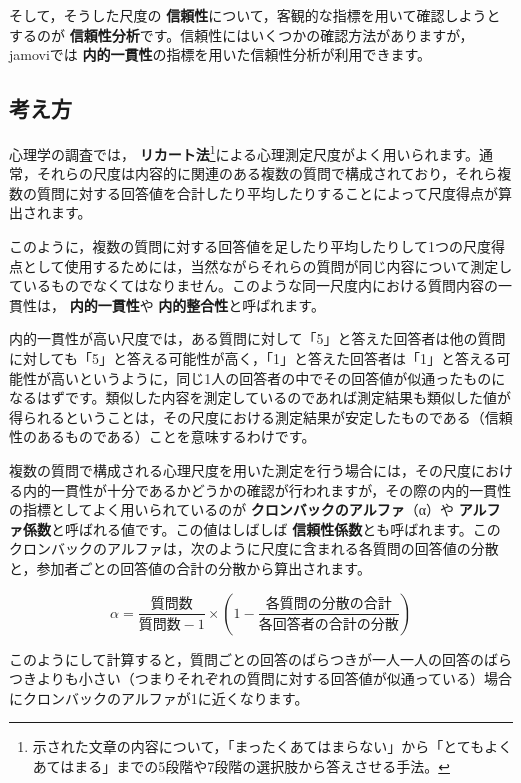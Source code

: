 \documentclass[
  12pt,
  a5jpaper,
  lualatex, ja=standard]{bxjsbook}
\renewcommand{\emph}[1]{\textbf{\color{emph} #1}}
\begin{document}
そして，そうした尺度の\emph{信頼性}について，客観的な指標を用いて確認しようとするのが\emph{信頼性分析}です。信頼性にはいくつかの確認方法がありますが，jamoviでは\emph{内的一貫性}の指標を用いた信頼性分析が利用できます。

\hypertarget{sub:factor-reliability-analysis-basic}{%
\subsection{考え方}\label{sub:factor-reliability-analysis-basic}}

心理学の調査では，\emph{リカート法}\footnote{示された文章の内容について，「まったくあてはまらない」から「とてもよくあてはまる」までの5段階や7段階の選択肢から答えさせる手法。}による心理測定尺度がよく用いられます。通常，それらの尺度は内容的に関連のある複数の質問で構成されており，それら複数の質問に対する回答値を合計したり平均したりすることによって尺度得点が算出されます。

このように，複数の質問に対する回答値を足したり平均したりして1つの尺度得点として使用するためには，当然ながらそれらの質問が同じ内容について測定しているものでなくてはなりません。このような同一尺度内における質問内容の一貫性は，\emph{内的一貫性}や\emph{内的整合性}と呼ばれます。

内的一貫性が高い尺度では，ある質問に対して「5」と答えた回答者は他の質問に対しても「5」と答える可能性が高く，「1」と答えた回答者は「1」と答える可能性が高いというように，同じ1人の回答者の中でその回答値が似通ったものになるはずです。類似した内容を測定しているのであれば測定結果も類似した値が得られるということは，その尺度における測定結果が安定したものである（信頼性のあるものである）ことを意味するわけです。

複数の質問で構成される心理尺度を用いた測定を行う場合には，その尺度における内的一貫性が十分であるかどうかの確認が行われますが，その際の内的一貫性の指標としてよく用いられているのが\emph{クロンバックのアルファ}（α）や\emph{アルファ係数}と呼ばれる値です。この値はしばしば\emph{信頼性係数}とも呼ばれます。このクロンバックのアルファは，次のように尺度に含まれる各質問の回答値の分散と，参加者ごとの回答値の合計の分散から算出されます。

\[
 \alpha = \frac{\text{質問数}}{\text{質問数}-1}\times\left(1-\displaystyle\frac{\text{各質問の分散の合計}}{\text{各回答者の合計の分散}}\right)
\]

このようにして計算すると，質問ごとの回答のばらつきが一人一人の回答のばらつきよりも小さい（つまりそれぞれの質問に対する回答値が似通っている）場合にクロンバックのアルファが1に近くなります。
\end{document}
